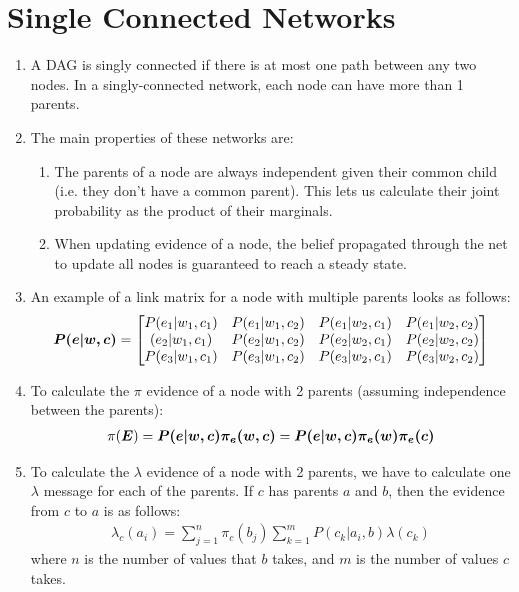 \documentclass[12pt,twoside]{article}
\begin{document}
\section{Single Connected Networks}
\begin{enumerate}
\item A DAG is singly connected if there is at most one path between any two nodes. In a singly-connected network, each node can have more than 1 parents.
\item The main properties of these networks are:
\begin{enumerate}
\item The parents of a node are always independent given their common child (i.e. they don't have a common parent). This lets us calculate their joint probability as the product of their marginals.
\item When updating evidence of a node, the belief propagated through the net to update all nodes is guaranteed to reach a steady state.
\end{enumerate}

\item An example of a link matrix for a node with multiple parents looks as follows:
\begin{align*}
{\boldsymbol{{P(e|w,c)}}} = \begin{bmatrix} 
P(e_1|w_1,c_1) & P(e_1|w_1,c_2) & P(e_1|w_2,c_1) & P(e_1|w_2,c_2)\\ 
(e_2|w_1,c_1) & P(e_2|w_1,c_2) & P(e_2|w_2,c_1) & P(e_2|w_2,c_2) \\ 
P(e_3|w_1,c_1) & P(e_3|w_1,c_2) & P(e_3|w_2,c_1) & P(e_3|w_2,c_2) \end{bmatrix}
\end{align*}


\item To calculate the \(\pi\) evidence of a node with 2 parents (assuming independence between the parents): 
\begin{align*} 
\pi({\boldsymbol{{E}}}) = {\boldsymbol{{P(e|w,c)}}}{\boldsymbol{{\pi_e(w,c)}}} = {\boldsymbol{{P(e|w,c)}}}{\boldsymbol{{\pi_e(w)\pi_e(c)}}}
\end{align*}

\item To calculate the \(\lambda\) evidence of a node with 2 parents, we have to calculate one \(\lambda\) message for each of the parents. If \(c\) has parents \(a\) and \(b\), then the evidence from \(c\) to \(a\) is as follows: 
\begin{align*} 
\lambda_c(a_i) = \sum_{j=1}^n\pi_{c}(b_j)\sum_{k=1}^m P(c_k|a_i,b)\lambda(c_k)
\end{align*}
where \(n\) is the number of values that \(b\) takes, and \(m\) is the number of values \(c\) takes. 



\end{enumerate}
\end{document}
